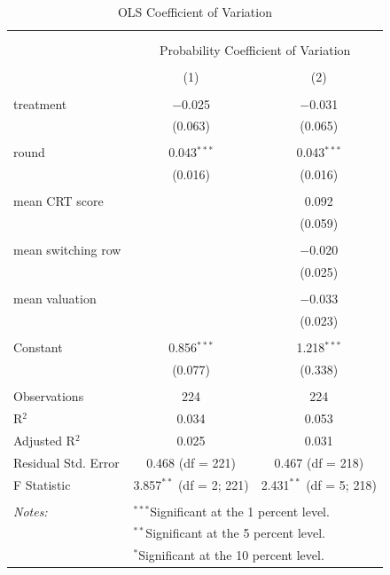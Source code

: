 \begin{table}[!htbp] \centering 
  \caption{OLS Coefficient of Variation} 
  \label{tab:var_coeff_ols} 
\begin{tabular}{@{\extracolsep{5pt}}lcc} 
\\[-1.8ex]\hline 
\hline \\[-1.8ex] 
\\[-1.8ex] & \multicolumn{2}{c}{Probability Coefficient of Variation} \\ 
\\[-1.8ex] & (1) & (2)\\ 
\hline \\[-1.8ex] 
 treatment & $-$0.025 & $-$0.031 \\ 
  & (0.063) & (0.065) \\ 
  & & \\ 
 round & 0.043$^{***}$ & 0.043$^{***}$ \\ 
  & (0.016) & (0.016) \\ 
  & & \\ 
 mean CRT score &  & 0.092 \\ 
  &  & (0.059) \\ 
  & & \\ 
 mean switching row &  & $-$0.020 \\ 
  &  & (0.025) \\ 
  & & \\ 
 mean valuation &  & $-$0.033 \\ 
  &  & (0.023) \\ 
  & & \\ 
 Constant & 0.856$^{***}$ & 1.218$^{***}$ \\ 
  & (0.077) & (0.338) \\ 
  & & \\
  \hline
Observations & 224 & 224 \\ 
R$^{2}$ & 0.034 & 0.053 \\ 
Adjusted R$^{2}$ & 0.025 & 0.031 \\ 
Residual Std. Error & 0.468 (df = 221) & 0.467 (df = 218) \\ 
F Statistic & 3.857$^{**}$ (df = 2; 221) & 2.431$^{**}$ (df = 5; 218) \\ 
\hline \\[-1.8ex] 
\textit{Notes:} & \multicolumn{2}{l}{$^{***}$Significant at the 1 percent level.} \\ 
 & \multicolumn{2}{l}{$^{**}$Significant at the 5 percent level.} \\ 
 & \multicolumn{2}{l}{$^{*}$Significant at the 10 percent level.} \\ 
\end{tabular} 
\end{table}

